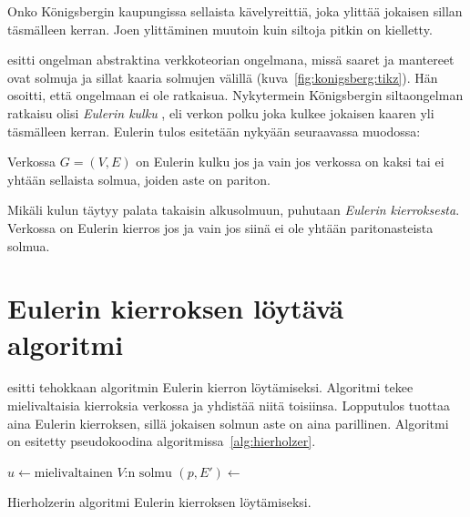 \begin{problem}
  \label{prob:konigsberg}
  Onko Königsbergin kaupungissa sellaista kävelyreittiä, joka ylittää jokaisen sillan täsmälleen kerran. Joen ylittäminen muutoin kuin siltoja pitkin on kielletty. 
\end{problem}

\citet{euler36solutio} esitti ongelman abstraktina verkkoteorian ongelmana, missä saaret ja mantereet ovat solmuja ja sillat kaaria solmujen välillä (kuva~\ref{fig:konigsberg:tikz}). Hän osoitti, että ongelmaan ei ole ratkaisua. Nykytermein Königsbergin siltaongelman ratkaisu olisi \emph{Eulerin kulku} , eli verkon polku joka kulkee jokaisen kaaren yli täsmälleen kerran. Eulerin tulos esitetään nykyään seuraavassa muodossa:

\begin{theorem}
  \label{thm:euler_path}
  Verkossa $G= (V, E)$ on Eulerin kulku jos ja vain jos verkossa on kaksi tai ei yhtään sellaista solmua, joiden aste on pariton.
\end{theorem}

Mikäli kulun täytyy palata takaisin alkusolmuun, puhutaan \emph{Eulerin kierroksesta}. Verkossa on Eulerin kierros jos ja vain jos siinä ei ole yhtään paritonasteista solmua.

\section{Eulerin kierroksen löytävä algoritmi}
\label{sec:euler_circuit_algo}

\citet{hierholzer73ueber} esitti tehokkaan algoritmin Eulerin kierron löytämiseksi. Algoritmi tekee mielivaltaisia kierroksia verkossa ja yhdistää niitä toisiinsa. Lopputulos tuottaa aina Eulerin kierroksen, sillä jokaisen solmun aste on aina parillinen. Algoritmi on esitetty pseudokoodina algoritmissa~\ref{alg:hierholzer}.

\begin{algorithm}[tb]
  \DontPrintSemicolon
  \BlankLine
  $u \gets \text{mielivaltainen $V$:n solmu}$\;
  $(p, E') \gets $  \label{alg:hierholzer:kierrosi}\;
  \BlankLine
  \caption{Hierholzerin algoritmi Eulerin kierroksen löytämiseksi.\label{alg:hierholzer}}
\end{algorithm}

